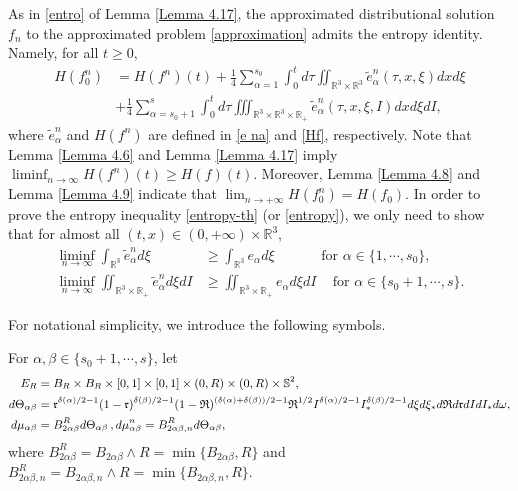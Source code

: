 \documentclass[reqno,11pt]{amsart}
\numberwithin{equation}{section}
\def\R{\mathbb{R}}
\begin{document}
As in \eqref{entro} of Lemma \ref{Lemma 4.17}, the approximated distributional solution $f_n$ to the approximated problem \eqref{approximation} admits the entropy identity. Namely, for all $t \geq 0 $,
\begin{equation*}
	\begin{aligned}
		H(f^n_{0})&=H(f^n)(t)+ \tfrac{1}{4}\sum \limits_{\alpha =1}^{s_0} \int_{0}^{t} d \tau \iint_{ \R^3 \times \R^3 } \tilde{e}_\alpha^n(\tau,x,\xi ) dxd\xi\\
		& +\tfrac{1}{4}\sum \limits_{\alpha =s_0+1}^{s}\int_{0}^{t} d \tau \iiint_{ \R^3 \times \R^3 \times \R_+}  \tilde{e}_\alpha^n(\tau,x,\xi ,I) dxd\xi dI,
	\end{aligned}
\end{equation*}
where $\tilde{e}_\alpha^n$ and $ H(f^n)$ are defined in \eqref{e na} and \eqref{Hf}, respectively. Note that Lemma \ref{Lemma 4.6} and Lemma \ref{Lemma 4.17} imply $ \liminf_{n \to \infty}H(f^n)(t) \geq H (f) (t) $. Moreover, Lemma \ref{Lemma 4.8} and Lemma \ref{Lemma 4.9} indicate that $ \lim_{n \to + \infty} H(f^n_{0}) = H (f_0) $. In order to prove the entropy inequality \eqref{entropy-th} (or \eqref{entropy}), we only need to show that for almost all $(t,x)\in (0,+\infty) \times \R^3$,
\begin{equation}\label{ena}
\begin{aligned}
\liminf_{n\rightarrow \infty} \int_{\R^3 } \tilde{e}_\alpha^n d\xi &\geq \int_{ \R^3 } e_\alpha d\xi \quad \qquad \text{ for } \alpha \in \{1,\cdots,s_0\},\\
\liminf_{n\rightarrow \infty} \iint_{ \R^3 \times \R_+} \tilde{e}_\alpha^n d\xi dI &\geq \iint_{ \R^3 \times \R_+} e_\alpha d\xi dI \quad \, \text{for } \alpha \in \{s_0+1,\cdots,s\}.
\end{aligned}
\end{equation}

For notational simplicity, we introduce the following symbols. 

For $ \alpha , \beta \in \{s_0+1,\cdots,s\}$, let
\begin{equation*}{\small
\begin{aligned}
E_R&=B_R\times B_R \times [0,1]\times [0,1]\times (0,R)\times (0,R)\times \mathbb{S}^2,\\
d \Theta_{\alpha \beta} &=\mathfrak{r}^{\delta(\alpha)/2-1}(1-\mathfrak{r})^{\delta(\beta )/2-1}(1-\mathfrak{R})^{(\delta(\alpha)+\delta(\beta ))/2-1}\mathfrak{R}^{1/2} I^{\delta(\alpha)/2-1} I_*^{\delta(\beta )/2-1}d\xi d\xi_* d \mathfrak{R} d \mathfrak{r} dI dI_* d\omega, \\
d\mu_{\alpha \beta} & = B^R_{2\alpha \beta } d \Theta_{\alpha \beta} \,, d \mu_{\alpha \beta}^n = B^R_{2\alpha \beta, n } d \Theta_{\alpha \beta},
\end{aligned}}
\end{equation*}
where $B^R_{2\alpha \beta }= B_{2\alpha \beta } \wedge R = \min \{ B_{2\alpha \beta } , R \} $ and $B^R_{2\alpha \beta, n }= B_{2\alpha \beta, n } \wedge R = \min \{ B_{2\alpha \beta, n } , R \} $. 
\end{document}

